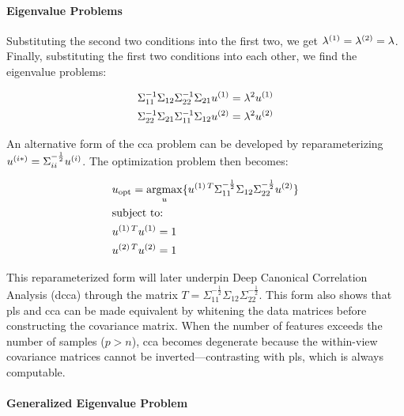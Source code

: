 \paragraph{Eigenvalue Problems}

Substituting the second two conditions into the first two, we get \(\lambda^{(1)}=\lambda^{(2)}=\lambda\). Finally, substituting the first two conditions into each other, we find the eigenvalue problems:

\begin{align}\label{eq:cca-eigenvalue-problems}
    & \Sigma_{11}^{-1}\Sigma_{12}\Sigma_{22}^{-1}\Sigma_{21}u^{(1)}=\lambda^2u^{(1)} \\
    & \Sigma_{22}^{-1}\Sigma_{21}\Sigma_{11}^{-1}\Sigma_{12}u^{(2)}=\lambda^2u^{(2)}
\end{align}

An alternative form of the \acrshort{cca} problem can be developed by reparameterizing \(u^{(i*)}=\Sigma_{ii}^{-\frac{1}{2}}u^{(i)}\). The optimization problem then becomes:

\begin{align}\label{eq:cca-reparameterized}
    & u_{\text{opt}}=\underset{u}{\mathrm{argmax}}\{ u^{(1)\,T}\Sigma_{11}^{-\frac{1}{2}}\Sigma_{12}\Sigma_{22}^{-\frac{1}{2}}u^{(2)} \} \\
    & \text{subject to:} \notag                                                                                                            \\
    & u^{(1)\,T}u^{(1)}=1 \notag                                                                                                         \\
    & u^{(2)\,T}u^{(2)}=1 \notag
\end{align}

This reparameterized form will later underpin Deep Canonical Correlation Analysis (\acrshort{dcca}) through the matrix $T=\Sigma_{11}^{-\frac{1}{2}}\Sigma_{12}\Sigma_{22}^{-\frac{1}{2}}$.
This form also shows that \acrshort{pls} and \acrshort{cca} can be made equivalent by whitening the data matrices before constructing the covariance matrix.
When the number of features exceeds the number of samples (\(p>n\)), \acrshort{cca} becomes degenerate because the within-view covariance matrices cannot be inverted—contrasting with \acrshort{pls}, which is always computable.

\paragraph{Generalized Eigenvalue Problem}

